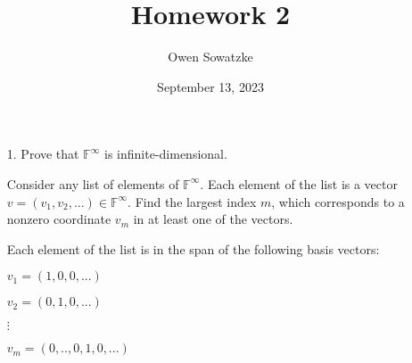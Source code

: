 \documentclass{article}
\title{Homework 2}
\author{Owen Sowatzke}
\date{September 13, 2023}
\begin{document}
	\maketitle
	\doublespace
	
	\begin{enumerate}[nolistsep]
	
		\item[1.] Prove that $\mathbb{F}^\infty$ is infinite-dimensional.
		
		Consider any list of elements of $\mathbb{F}^\infty$. Each element of the list is a vector $v = (v_1, v_2, ...) \in \mathbb{F}^\infty$. Find the largest index $m$, which corresponds to a nonzero coordinate $v_m$ in at least one of the vectors.
		
		 Each element of the list is in the span of the following basis vectors:
		 
		 $v_1 = (1, 0, 0, ...)$
		 
		 $v_2 = (0, 1, 0, ...)$
		 
		 $\vdots$
		 
		 $v_m = (0, .., 0, 1, 0, ...)$
		 
		
	\end{enumerate}
	
\end{document}
